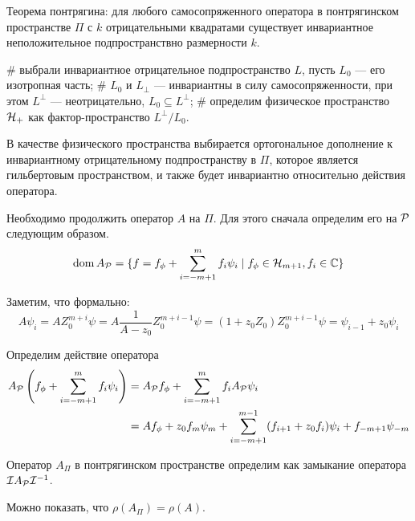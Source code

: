 


Теорема понтрягина: для любого самосопряженного оператора в понтрягинском пространстве $\Pi$ с $k$ отрицательными квадратами существует инвариантное неположительное подпространствно размерности $k$. 

\begin{elist}
# выбрали инвариантное отрицательное подпространство $L$, пусть $L_0$ — его изотропная часть;
# $L_0$ и $L_\perp$ — инвариантны в силу самосопряженности, при этом $L^\perp$ — неотрицательно, $L_0 \subseteq L^\perp$;
# определим физическое пространство $\mathcal{H}_{+}$ как фактор-пространство $L^\perp / L_0$.
\end{elist}

В качестве физического пространства выбирается ортогональное дополнение к инвариантному отрицательному подпространству в $\Pi$, которое является гильбертовым пространством, и также будет инвариантно относительно действия оператора.


Необходимо продолжить оператор $A$ на $\Pi$. Для этого сначала определим его на $\mathcal{P}$ следующим образом.
\[
\operatorname{dom} A_{\mathcal{P}} = \{f = f_\phi + \sum\limits_{i = -m + 1}^{m} f_i \psi_i \mid f_\phi \in \mathcal{H}_{m + 1}, f_{i}\in \mathbb{C} \}
\]

Заметим, что формально:
\[
A \psi_i = A Z_0^{m + i} \psi = A \frac{1}{A - z_0} Z_0^{m + i - 1} \psi = (1 + z_0 Z_0) Z_0^{m + i - 1} \psi = \psi_{i - 1} + z_0 \psi_i
\]

Определим действие оператора 
\begin{align*}
A_{\mathcal{P}} \left( f_\phi + \sum\limits_{i = -m + 1}^{m} f_i \psi_i \right)
& = A_{\mathcal{P}} f_\phi + \sum\limits_{i = -m + 1}^{m} f_i A_{\mathcal{P}} \psi_i \\
& = A f_\phi + z_0 f_m \psi_m + \sum\limits_{i = -m + 1}^{m - 1} (f_{i + 1} + z_0 f_i) \psi_i + f_{-m + 1} \psi_{-m}
\end{align*}

Оператор $A_\Pi$ в понтрягинском пространстве определим как замыкание оператора $\mathcal{I} A_{\mathcal{P}} \mathcal{I}^{-1}$. 

Можно показать, что $\rho(A_\Pi) = \rho(A)$.


